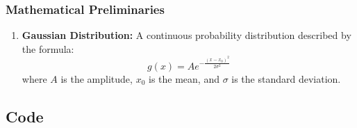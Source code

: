 \documentclass{article}
\begin{document}
\subsubsection{Mathematical Preliminaries}
\begin{enumerate}
    \item \textbf{Gaussian Distribution:} A continuous probability distribution described by the formula:
    \begin{equation}
        g(x) = Ae^{-\frac{(x-x_0)^2}{2\sigma^2}}
    \end{equation}
    where $A$ is the amplitude, $x_0$ is the mean, and $\sigma$ is the standard deviation.
\end{enumerate}
\subsection{Code}






\end{document}
